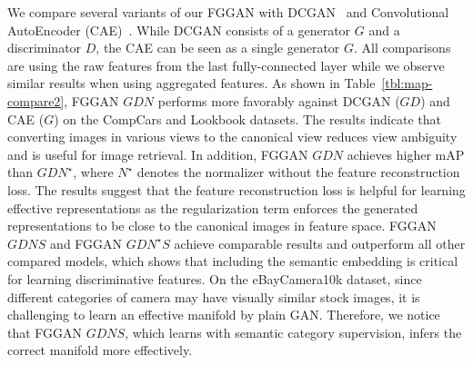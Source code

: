 \documentclass[runningheads]{llncs}
\begin{document}
We compare several variants of our FGGAN with DCGAN~\cite{radford2015unsupervised} and Convolutional AutoEncoder (CAE)~\cite{masci2011stacked}. 
While DCGAN consists of a generator $G$ and a discriminator $D$, the CAE can be seen as a single generator $G$. 
{All comparisons are using the raw features from the last fully-connected layer while we observe similar results when using aggregated features.}%
As shown in Table~\ref{tbl:map-compare2}, FGGAN $GDN$ performs more favorably against DCGAN ($GD$) and CAE ($G$) on the CompCars and Lookbook datasets. 
The results indicate that converting images in various views to the canonical view reduces view ambiguity and is useful for image retrieval. 
In addition, FGGAN $GDN$ achieves higher mAP than $GDN^\star$, where $N^\star$ denotes the normalizer without the feature reconstruction loss. 
The results suggest that the feature reconstruction loss is helpful for learning effective representations as the regularization term enforces the generated representations to be close to the canonical images in feature space. 
FGGAN $GDNS$ and FGGAN $GDN^{\star}S$ achieve comparable results and outperform all other compared models, which shows that including the semantic embedding is critical for learning discriminative features.
On the eBayCamera10k dataset, since different categories of camera may have visually similar stock images, it is challenging to learn an effective manifold by plain GAN. 
Therefore, we notice that FGGAN $GDNS$, which learns with semantic category supervision, infers the correct manifold more effectively.
\end{document}
